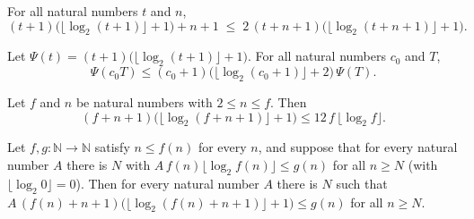 \begin{theorem}
\label{Complexity.TimeHierarchy.logOverhead_add_le}
\leanok
{}
For all natural numbers $t$ and $n$,
\[(t+1)\bigl(\lfloor\log_2(t+1)\rfloor+1\bigr) + n + 1 \;\le\;
2\,(t+n+1)\bigl(\lfloor\log_2(t+n+1)\rfloor+1\bigr).\]
\end{theorem}

\begin{theorem}
\label{Complexity.TimeHierarchy.logOverhead_mul_le}
\leanok
{}
Let $\Psi(t) = (t+1)\bigl(\lfloor\log_2(t+1)\rfloor+1\bigr)$. For all natural numbers $c_0$
and $T$,
\[\Psi(c_0T) \le (c_0+1)\bigl(\lfloor\log_2(c_0+1)\rfloor+2\bigr)\,\Psi(T).\]
\end{theorem}

\begin{theorem}
\label{Complexity.TimeHierarchy.logDiagOverhead_le_book}
\leanok
{}
Let $f$ and $n$ be natural numbers with $2 \le n \le f$. Then
\[(f+n+1)\bigl(\lfloor\log_2(f+n+1)\rfloor+1\bigr) \le 12\, f\,\lfloor\log_2 f\rfloor.\]
\end{theorem}

\begin{theorem}[From $f\log f = o(g)$ to the diagonal bound]
\label{Complexity.TimeHierarchy.eventually_logDiagOverhead_le}
\leanok
{}
Let $f,g:\mathbb{N}\to\mathbb{N}$ satisfy $n \le f(n)$ for every $n$, and suppose that for
every natural number $A$ there is $N$ with $A\,f(n)\lfloor\log_2 f(n)\rfloor \le g(n)$ for all
$n \ge N$ (with $\lfloor\log_2 0\rfloor = 0$). Then for every natural number $A$ there is $N$
such that $A\,(f(n)+n+1)\bigl(\lfloor\log_2(f(n)+n+1)\rfloor+1\bigr) \le g(n)$ for all
$n \ge N$.
\end{theorem}

